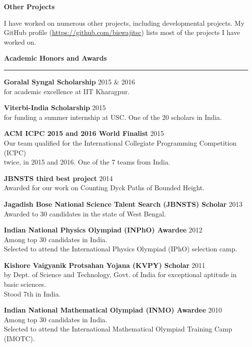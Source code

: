 \documentclass[10pt]{article}
\newcommand{\heading}[1]{
 {\large \textbf{#1}}
  \vspace{0.4em}
  \hrule
  \vspace{0.4em}
}
\newcommand{\EntryGap}{\vspace{0.4	cm}}
\newcommand{\SmallEntryGap}{\vspace{0.2cm}}
\newcommand{\indentedpar}[1]{
  \hangindent=1cm \hangafter=0 #1
}
\begin{document}
\textbf{Other Projects}

\SmallEntryGap

\indentedpar{
  I have worked on numerous other projects, including developmental projects. My GitHub
  profile (\url{https://github.com/biswajitsc}) lists most of the projects I have worked on.
}




\EntryGap
\heading{Academic Honors and Awards}
 
 \textbf{Goralal Syngal Scholarship} \hfill 2015 \& 2016\\
 for academic excellence at IIT Kharagpur.
 \SmallEntryGap
  
 \textbf{Viterbi-India Scholarship} \hfill 2015\\
  for funding a summer internship at USC. One of the 20 scholars in India.
  \SmallEntryGap
  
 \textbf{ACM ICPC 2015 and 2016 World Finalist} \hfill 2015\\
  Our team qualified for the International Collegiate Programming Competition (ICPC)\\
  twice, in 2015 and 2016. One of the 7 teams from India.
  \SmallEntryGap
  
 \textbf{JBNSTS third best project} \hfill 2014\\
  Awarded for our work on Counting Dyck Paths of Bounded Height.
  \SmallEntryGap
  
 \textbf{Jagadish Bose National Science Talent Search (JBNSTS) Scholar} \hfill 2013\\
  Awarded to 30 candidates in the state of West Bengal.
  \SmallEntryGap
  
 \textbf{Indian National Physics Olympiad (INPhO) Awardee} \hfill 2012\\
  Among top 30 candidates in India.\\
  Selected to attend the 
  International Physics Olympiad (IPhO) selection camp.
  \SmallEntryGap
  
 \textbf{Kishore Vaigyanik Protsahan Yojana (KVPY) Scholar} \hfill 2011\\
  by Dept. of Science and Technology, Govt. of India for exceptional aptitude in basic sciences.\\
  Stood 7th in India.
  \SmallEntryGap
  
 \textbf{Indian National Mathematical Olympiad (INMO) Awardee} \hfill 2010\\
  Among top 30 candidates in India.\\
  Selected to attend the International Mathematical Olympiad Training Camp (IMOTC).
  \SmallEntryGap
  
\end{document}
